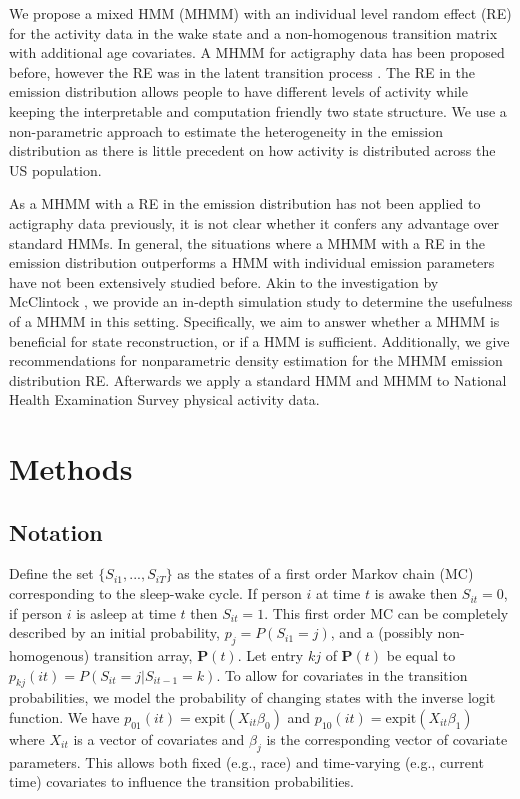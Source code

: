 \documentclass[num-refs]{wiley-article}
\begin{document}
We propose a mixed HMM (MHMM) \cite{altmanMixedHiddenMarkov2007, maruotti2009,maruottiMixedHiddenMarkov2011} with an individual level random effect (RE) for the activity data in the wake state and a non-homogenous transition matrix with additional age covariates. A MHMM for actigraphy data has been proposed before, however the RE was in the latent transition process \cite{Duroy2020}. The RE in the emission distribution allows people to have different levels of activity while keeping the interpretable and computation friendly two state structure. We use a non-parametric approach to estimate the heterogeneity in the emission distribution as there is little precedent on how activity is distributed across the US population.

As a MHMM with a RE in the emission distribution has not been applied to actigraphy data previously, it is not clear whether it confers any advantage over standard HMMs. In general, the situations where a MHMM with a RE in the emission distribution outperforms a HMM with individual emission parameters have not been extensively studied before. Akin to the investigation by McClintock \cite{mcclintock2021}, we provide an in-depth simulation study to determine the usefulness of a MHMM in this setting. Specifically, we aim to answer whether a MHMM is beneficial for state reconstruction, or if a HMM is sufficient. Additionally, we give recommendations for nonparametric density estimation for the MHMM emission distribution RE. Afterwards we apply a standard HMM and MHMM to National Health Examination Survey physical activity data.

\section{Methods} \label{Methods}
\subsection{Notation}

Define the set $\{S_{i1}, ..., S_{iT}\}$ as the states of a first order Markov chain (MC) corresponding to the sleep-wake cycle. If person $i$ at time $t$ is awake then $S_{it}=0$, if person $i$ is asleep at time $t$ then $S_{it}=1$. This first order MC can be completely described by an initial probability, $p_j=P(S_{i1} =j)$, and a (possibly non-homogenous) transition array, $\mathbf{P}(t)$.  Let entry $kj$ of $\mathbf{P}(t)$ be equal to $p_{kj}(it)=P(S_{it}=j|S_{it-1}=k)$. To allow for covariates in the transition probabilities, we model the probability of changing states with the inverse logit function. We have $p_{01}(it) = \text{expit}(X_{it}\beta_0)$ and $p_{10}(it) = \text{expit}(X_{it}\beta_1)$ where $X_{it}$ is a vector of covariates and $\beta_j$ is the corresponding vector of covariate parameters. This allows both fixed (e.g., race) and time-varying (e.g., current time) covariates to influence the transition probabilities.
\end{document}
